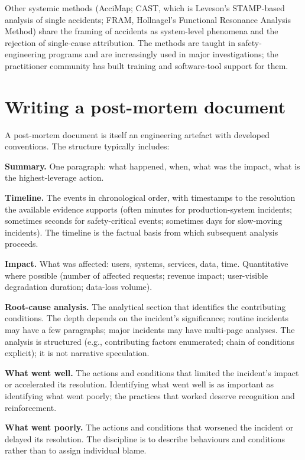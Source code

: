 Other systemic methods (AcciMap; CAST, which is Leveson's STAMP-based analysis of single accidents; FRAM, Hollnagel's Functional Resonance Analysis Method) share the framing of accidents as system-level phenomena and the rejection of single-cause attribution. The methods are taught in safety-engineering programs and are increasingly used in major investigations; the practitioner community has built training and software-tool support for them.

\section{Writing a post-mortem document}

A post-mortem document is itself an engineering artefact with developed conventions. The structure typically includes:

\textbf{Summary.} One paragraph: what happened, when, what was the impact, what is the highest-leverage action.

\textbf{Timeline.} The events in chronological order, with timestamps to the resolution the available evidence supports (often minutes for production-system incidents; sometimes seconds for safety-critical events; sometimes days for slow-moving incidents). The timeline is the factual basis from which subsequent analysis proceeds.

\textbf{Impact.} What was affected: users, systems, services, data, time. Quantitative where possible (number of affected requests; revenue impact; user-visible degradation duration; data-loss volume).

\textbf{Root-cause analysis.} The analytical section that identifies the contributing conditions. The depth depends on the incident's significance; routine incidents may have a few paragraphs; major incidents may have multi-page analyses. The analysis is structured (e.g., contributing factors enumerated; chain of conditions explicit); it is not narrative speculation.

\textbf{What went well.} The actions and conditions that limited the incident's impact or accelerated its resolution. Identifying what went well is as important as identifying what went poorly; the practices that worked deserve recognition and reinforcement.

\textbf{What went poorly.} The actions and conditions that worsened the incident or delayed its resolution. The discipline is to describe behaviours and conditions rather than to assign individual blame.

